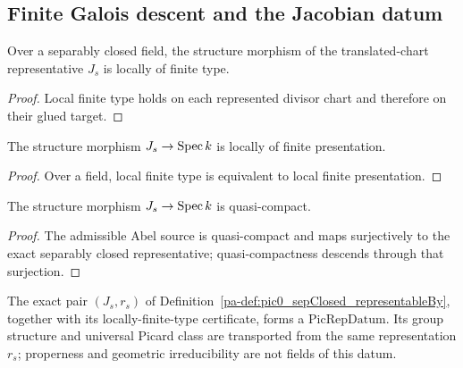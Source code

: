 \subsection{Finite Galois descent and the Jacobian datum}

\begin{theorem}
  \label{pa-thm:pic0SepClosed_lft}
  \leanok

  Over a separably closed field, the structure morphism of the translated-chart
  representative \(J_s\) is locally of finite type.
\end{theorem}
\begin{proof}
  \leanok
  Local finite type holds on each represented divisor chart and therefore on their glued
  target.
\end{proof}

\begin{theorem}
  \label{pa-thm:pic0SepClosed_lfp}
  \leanok

  The structure morphism \(J_s\to\operatorname{Spec} k\) is locally of finite presentation.
\end{theorem}
\begin{proof}
  \leanok
  Over a field, local finite type is equivalent to local finite presentation.
\end{proof}

\begin{theorem}
  \label{pa-thm:pic0SepClosed_qc}
  \leanok

  The structure morphism \(J_s\to\operatorname{Spec} k\) is quasi-compact.
\end{theorem}
\begin{proof}
  \leanok
  The admissible Abel source is quasi-compact and maps surjectively to the exact
  separably closed representative; quasi-compactness descends through that surjection.
\end{proof}

\begin{definition}
  \label{pa-def:pic0SepClosedDescentInput}
  \leanok

  The exact pair \((J_s,r_s)\) of
  Definition~\ref{pa-def:pic0_sepClosed_representableBy}, together with its locally-finite-type
  certificate, forms a \(\mathrm{PicRepDatum}\).  Its group structure and universal Picard
  class are transported from the same representation \(r_s\); properness and geometric
  irreducibility are not fields of this datum.
\end{definition}

